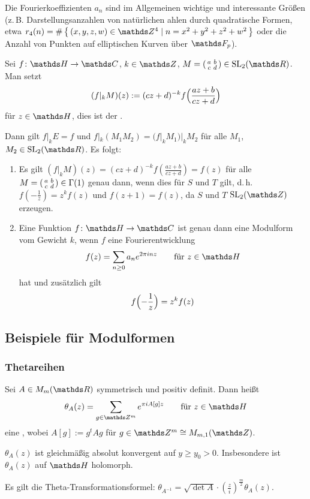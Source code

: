 \begin{beme}
	Die Fourierkoeffizienten $a_n$ sind im Allgemeinen wichtige und interessante Größen (z.\,B. Darstellungsanzahlen von natürlichen ahlen durch quadratische Formen, etwa $r_4(n) = \#\Set{(x,y,z,w) \in \ZZ^4 \mid n = x^2+y^2+z^2+w^2}$ oder die Anzahl von Punkten auf elliptischen Kurven über $\FF_p$).
\end{beme}

\begin{defi}
	Sei $f\colon \HH \ra \CC$, $k\in\ZZ$, $M = \abcd \in \SL_2(\RR)$.
	Man setzt
	\[
		(f|_kM)(z) := (cz+d)^{-k} f\Bigl(\frac{az+b}{cz+d}\Bigr)
	\]
	für $z\in\HH$, dies ist der .
\end{defi}

Dann gilt $f|_kE = f$ und $f|_k(M_1M_2) = (f|_kM_1)|_kM_2$ für alle $M_1$, $M_2 \in \SL_2(\RR)$.
Es folgt:
\begin{enumerate}
	\item Es gilt $(f|_kM)(z) = (cz+d)^{-k} f(\frac{az+b}{cz+d}) = f(z)$ für alle $M = \abcd \in \Gamma(1)$ genau dann, wenn dies für $S$ und $T$ gilt, d.\,h. $f(-\frac{1}{z}) = z^k f(z)$ und $f(z+1) = f(z)$, da $S$ und $T$ $\SL_2(\ZZ)$ erzeugen.
	\item Eine Funktion $f\colon \HH \ra \CC$ ist genau dann eine Modulform vom Gewicht $k$, wenn $f$ eine Fourierentwicklung
	\[
		f(z) = \sum_{n \geq 0} a_n e^{2\pi inz}
		\qquad \text{für }
		z \in \HH
	\]
	hat und zusätzlich gilt
	\[
		f\Bigl(-\frac{1}{z}\Bigr) = z^k f(z)
	\]
\end{enumerate}

\subsection{Beispiele für Modulformen}

\subsubsection{Thetareihen}

\begin{defi}
	Sei $A \in M_m(\RR)$ symmetrisch und positiv definit.
	Dann heißt
	\[
		\theta_A(z) = \sum_{g \in \ZZ^m} e^{\pi i A[g]z}
		\qquad \text{für }
		z \in \HH
	\]
	eine , wobei $A[g] := g^t A g$ für $g \in \ZZ^m \cong M_{m,1}(\ZZ)$.
\end{defi}

\begin{satz-list}
	\item $\theta_A(z)$ ist gleichmäßig absolut konvergent auf $y \geq y_0 > 0$.
	Insbesondere ist $\theta_A(z)$ auf $\HH$ holomorph.
	\item Es gilt die Theta-Transformationsformel: $\theta_{A^{-1}} = \sqrt{\det A} \cdot (\frac{z}{i})^{\frac{m}{2}} \theta_A(z)$.
\end{satz-list}

